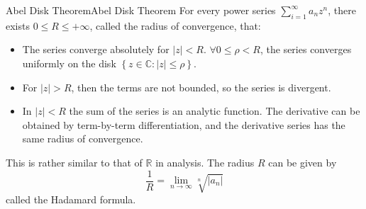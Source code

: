 \documentclass[../main.tex]{subfiles}
\begin{document}
\begin{theorem}{Abel Disk Theorem}{Abel Disk Theorem}
For every power series $\sum_{i=1}^{\infty } a_n z^n$, there exists $0\leq R\leq +\infty $, called the radius of convergence, that:
\begin{itemize}
	\item The series converge absolutely for $\left|z\right|<R$. $\forall 0\leq \rho<R$, the series converges uniformly on the disk $\left\{ z\in \mathbb{C}: \left|z\right|\leq \rho \right\}$.
	\item For $\left|z\right|>R$, then the terms are not bounded, so the series is divergent.
	\item In $\left|z\right|<R$ the sum of the series is an analytic  function. The derivative can be obtained by term-by-term differentiation, and the derivative series has the same radius of convergence.
\end{itemize}
\end{theorem}
This is rather similar to that of $\mathbb{R}$ in analysis. The radius $R$ can be given by
\begin{equation}
	\frac{1}{R} = \lim_{n \to \infty } \sqrt[n]{\left|a_n\right|}
\end{equation}
called the Hadamard formula.
\end{document}
